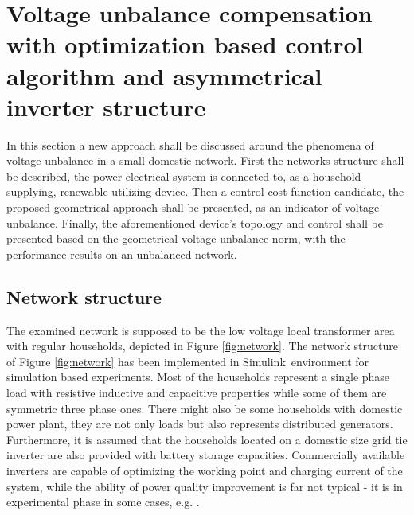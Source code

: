 \chapter[Voltage unbalance compensation]{Voltage unbalance compensation with optimization based control algorithm and asymmetrical inverter structure}\label{VUB:sec:Main}

In this section a new approach shall be discussed around the phenomena of voltage unbalance in a small domestic network. First the networks structure shall be described, the power electrical system is connected to, as a household supplying, renewable utilizing device. Then a control cost-function candidate, the proposed geometrical approach shall be presented, as an indicator of voltage unbalance. Finally, the aforementioned device's topology and control shall be presented based on the geometrical voltage unbalance norm, with the performance results on an unbalanced network.
		
\section{Network structure}\label{VUB:sec:Network}

         The examined network is supposed to be the low voltage local transformer area with regular households, depicted in Figure \ref{fig:network}. The network structure of Figure \ref{fig:network} has been implemented in Simulink\texttrademark\, environment for simulation based experiments. Most of the households represent a single phase load with resistive inductive and capacitive properties while some of them are symmetric three phase ones. There might also be some households with domestic power plant, they are not only loads but also represents distributed generators. Furthermore, it is assumed that the households located on a domestic size grid tie inverter are also provided with battery storage capacities. Commercially available inverters are capable of optimizing the working point and charging current of the system, while the ability of power quality improvement is far not typical - it is in experimental phase in some cases, e.g. \cite{gorbe2012reduction}.%

